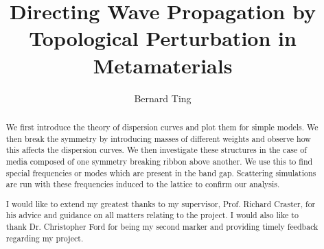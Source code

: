 \documentclass[a4paper, twoside]{report}
\title{Directing Wave Propagation by Topological Perturbation in Metamaterials}
\author{Bernard Ting}
\begin{document}


\begin{abstract}
We first introduce the theory of dispersion curves and plot them for simple
models. We then break the symmetry by introducing masses of different weights
and observe how this affects the dispersion curves. We then investigate these
structures in the case of media composed of one symmetry breaking ribbon above
another. We use this to find special frequencies or modes which are present in
the band gap. Scattering simulations are run with these frequencies induced to
the lattice to confirm our analysis.
\end{abstract}

\renewcommand{\abstractname}{Acknowledgements}
\begin{abstract}
I would like to extend my greatest thanks to my supervisor, Prof. Richard
Craster, for his advice and guidance on all matters relating to the project. I
would also like to thank Dr. Christopher Ford for being my second marker and
providing timely feedback regarding my project.
\end{abstract}

\tableofcontents














\end{document}
